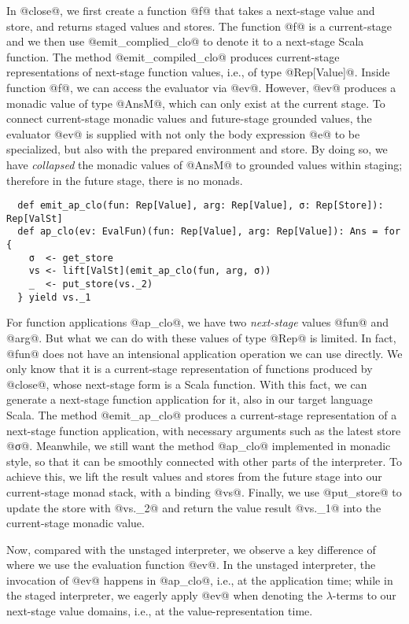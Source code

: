 In @close@, we first create a function @f@ that takes a next-stage value and
store, and returns staged values and stores. The function @f@ is a
current-stage and we then use @emit_complied_clo@ to denote it to a next-stage
Scala function.
The method @emit_compiled_clo@ produces current-stage representations of
next-stage function values, i.e., of type @Rep[Value]@.
Inside function @f@, we can access the evaluator via @ev@.
However, @ev@ produces a monadic value of type @AnsM@, which can only exist at
the current stage. To connect current-stage monadic values and future-stage
grounded values, the evaluator @ev@ is supplied with not only the body
expression @e@ to be specialized, but also with the prepared environment and
store.  By doing so, we have \textit{collapsed} the monadic values of @AnsM@ to
grounded values within staging; therefore in the future stage, there is no
monads.
\begin{lstlisting}
  def emit_ap_clo(fun: Rep[Value], arg: Rep[Value], σ: Rep[Store]): Rep[ValSt]
  def ap_clo(ev: EvalFun)(fun: Rep[Value], arg: Rep[Value]): Ans = for {
    σ  <- get_store
    vs <- lift[ValSt](emit_ap_clo(fun, arg, σ))
    _  <- put_store(vs._2)
  } yield vs._1
\end{lstlisting}

For function applications @ap_clo@, we have two \textit{next-stage} values @fun@
and @arg@. But what we can do with these values of type @Rep@ is limited. 
In fact, @fun@ does not have an intensional application operation we can use
directly. We only know that it is a current-stage representation of functions produced by @close@,
whose next-stage form is a Scala function.
With this fact, we can generate a next-stage function application for it, also
in our target language Scala. The method @emit_ap_clo@ produces a current-stage
representation of a next-stage function application, with necessary arguments
such as the latest store @σ@. Meanwhile, we still want the method @ap_clo@
implemented in monadic style, so that it can be smoothly connected with other
parts of the interpreter.  To achieve this, we lift the result values and
stores from the future stage into our current-stage monad stack, with a binding
@vs@.  Finally, we use @put_store@ to update the store with @vs._2@ and return
the value result @vs._1@ into the current-stage monadic value.

Now, compared with the unstaged interpreter, we observe a key difference of where
we use the evaluation function @ev@.  In the unstaged interpreter, the
invocation of @ev@ happens in @ap_clo@, i.e., at the application time; while in
the staged interpreter, we eagerly apply @ev@ when denoting the $\lambda$-terms to
our next-stage value domains, i.e., at the value-representation time.

